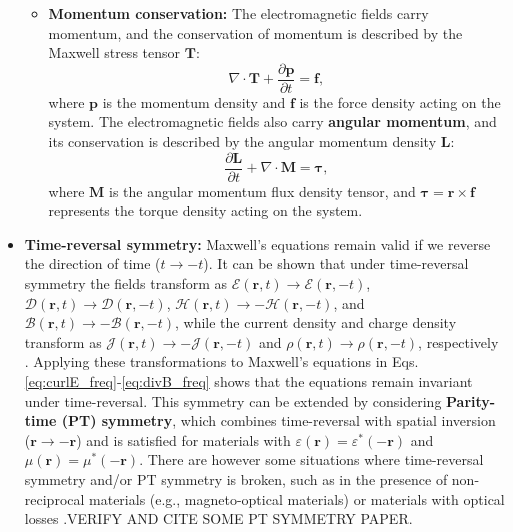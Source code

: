 \begin{itemize}
\begin{itemize}
        \item \textbf{Momentum conservation:} The electromagnetic fields carry momentum, and the conservation of momentum is described by the Maxwell stress tensor $\mathbf{T}$:
        \begin{equation}
            \nabla \cdot \mathbf{T} + \frac{\partial \mathbf{p}}{\partial t} = \mathbf{f},
        \end{equation}
        where $\mathbf{p}$ is the momentum density and $\mathbf{f}$ is the force density acting on the system. The electromagnetic fields also carry \textbf{angular momentum}, and its conservation is described by the angular momentum density $\mathbf{L}$:
                    \begin{equation}
                        \frac{\partial \mathbf{L}}{\partial t} + \nabla \cdot \mathbf{M} = \boldsymbol{\tau},
                    \end{equation}
                    where $\mathbf{M}$ is the angular momentum flux density tensor, and $\boldsymbol{\tau} = \mathbf{r} \times \mathbf{f}$ represents the torque density acting on the system.
    \end{itemize}
    
    \item \textbf{Time-reversal symmetry:} Maxwell's equations remain valid if we reverse the direction of time ($t\to-t$). It can be shown that under time-reversal symmetry
                                                the fields transform as $\bm{\mathcal{E}}(\mathbf{r}, t)\to\bm{\mathcal{E}}(\mathbf{r}, -t)$,  $\bm{\mathcal{D}}(\mathbf{r}, t)\to\bm{\mathcal{D}}(\mathbf{r}, -t)$,
                                                 $\bm{\mathcal{H}}(\mathbf{r}, t)\to-\bm{\mathcal{H}}(\mathbf{r}, -t)$, and $\bm{\mathcal{B}}(\mathbf{r}, t)\to-\bm{\mathcal{B}}(\mathbf{r}, -t)$, while the current density and charge density transform as 
                                                 $\bm{\mathcal{J}}(\mathbf{r}, t)\to-\bm{\mathcal{J}}(\mathbf{r}, -t)$ and $\bm{\mathcal{\rho}}(\mathbf{r}, t)\to\bm{\mathcal{\rho}}(\mathbf{r}, -t)$, respectively \cite{reciprocity}.
                                                 Applying these transformations to Maxwell's equations in Eqs. \eqref{eq:curlE_freq}-\eqref{eq:divB_freq} shows that the equations remain invariant under time-reversal. This 
                                                 symmetry can be extended by considering \textbf{Parity-time (PT) symmetry}, which combines time-reversal with spatial inversion ($\mathbf{r}\to-\mathbf{r}$) and is satisfied for materials with
                                                 $\varepsilon(\mathbf{r}) = \varepsilon^*(-\mathbf{r})$ and $\mu(\mathbf{r}) = \mu^*(-\mathbf{r})$. There are however some situations where time-reversal symmetry and/or PT symmetry is broken, 
                                                 such as in the presence of non-reciprocal materials (e.g., magneto-optical materials) or materials with optical losses \cite{ownpub0}.VERIFY AND CITE SOME PT SYMMETRY PAPER.
        

\end{itemize}
